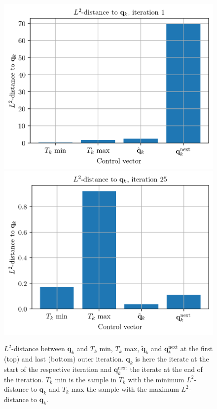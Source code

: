 \begin{figure}
\centering
\includegraphics{Plots/firstL2Dist.png}
\includegraphics{Plots/lastL2Dist.png}
\caption{\label{L2Dist}$L^2$-distance between $\mathbf{q}_k$ and $T_k$ min, $T_k$ max, $\tilde{\mathbf{q}}_k$ and $\mathbf{q}^\mathrm{next}_k$ at the first (top) and last (bottom) outer iteration. $\mathbf{q}_k$ is here the iterate at the start of the respective iteration and $\mathbf{q}^\mathrm{next}_k$ the iterate at the end of the iteration. $T_k$ min is the sample in $T_k$ with the minimum $L^2$-distance to $\mathbf{q}_k$ and $T_k$ max the sample with the maximum $L^2$-distance to $\mathbf{q}_k$.}
\end{figure}

